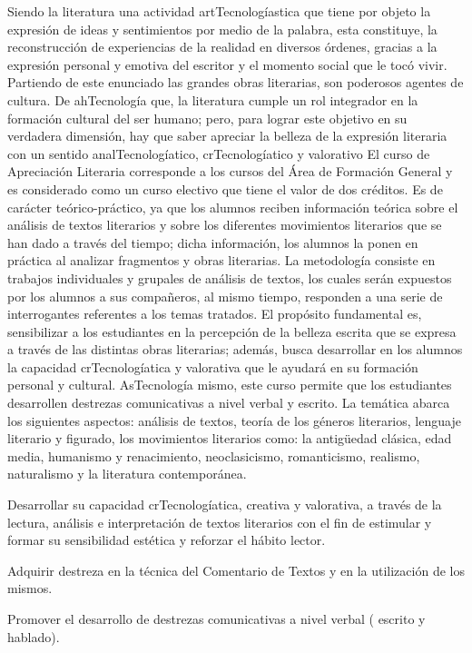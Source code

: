 \begin{syllabus}


\begin{justification}
Siendo la literatura una actividad artTecnologíastica que tiene por objeto la expresión de ideas y sentimientos por medio de la palabra, esta constituye, la reconstrucción de experiencias de la realidad en diversos órdenes, gracias a la expresión personal y emotiva del escritor y el momento social que le tocó vivir.
Partiendo de este enunciado las grandes obras literarias, son poderosos agentes de cultura. De ahTecnología que, la literatura cumple un rol integrador en la formación cultural del ser humano; pero,  para lograr este objetivo en su verdadera dimensión, hay que saber apreciar la belleza de la expresión literaria con un sentido analTecnologíatico, crTecnologíatico y valorativo
El curso de Apreciación Literaria corresponde a los cursos del Área de Formación General y es considerado como un curso electivo que tiene el valor de dos créditos. Es de carácter teórico-práctico, ya que los alumnos reciben información teórica sobre el análisis de textos literarios y sobre los diferentes movimientos literarios que se han dado a través del tiempo; dicha información, los alumnos la ponen en práctica al analizar fragmentos y obras literarias. La metodología consiste en trabajos individuales y grupales de análisis de textos, los cuales serán expuestos por los alumnos a sus compañeros, al mismo tiempo, responden a una serie de interrogantes referentes a los temas tratados. El propósito fundamental es, sensibilizar a los estudiantes en la percepción de la belleza escrita que se expresa a través de las distintas obras literarias; además, busca desarrollar en los alumnos la capacidad crTecnologíatica y valorativa que le ayudará en su formación personal y cultural. AsTecnología mismo, este curso permite que los estudiantes desarrollen destrezas comunicativas a nivel verbal y escrito.
La temática abarca los siguientes aspectos: análisis de textos, teoría de los géneros literarios, lenguaje literario y figurado, los movimientos literarios como: la antigüedad clásica, edad media, humanismo y renacimiento, neoclasicismo, romanticismo, realismo, naturalismo y la literatura contemporánea.
\end{justification}

\begin{goals}
\item Desarrollar su capacidad crTecnologíatica, creativa y valorativa, a través de la lectura, análisis e interpretación de textos literarios con el fin de estimular y formar su sensibilidad estética y reforzar el hábito lector.
\item Adquirir destreza en la técnica del Comentario de Textos y en la utilización de los mismos.
\item Promover el desarrollo de destrezas comunicativas a nivel verbal ( escrito y hablado).
\end{goals}


\end{syllabus}
